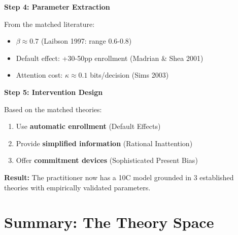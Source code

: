 \begin{tcolorbox}[colback=green!5!white, colframe=green!75!black,
    title=\textbf{Worked Example: Retirement Savings Intervention}]
\textbf{Step 4: Parameter Extraction}

From the matched literature:
\begin{itemize}[nosep]
    \item $\beta \approx 0.7$ (Laibson 1997: range 0.6-0.8)
    \item Default effect: +30-50pp enrollment (Madrian \& Shea 2001)
    \item Attention cost: $\kappa \approx 0.1$ bits/decision (Sims 2003)
\end{itemize}

\textbf{Step 5: Intervention Design}

Based on the matched theories:
\begin{enumerate}[nosep]
    \item Use \textbf{automatic enrollment} (Default Effects)
    \item Provide \textbf{simplified information} (Rational Inattention)
    \item Offer \textbf{commitment devices} (Sophisticated Present Bias)
\end{enumerate}

\textbf{Result:} The practitioner now has a 10C model grounded in 3 established
theories with empirically validated parameters.

\end{tcolorbox}

\section{Summary: The Theory Space}
\label{sec:ms-summary}

